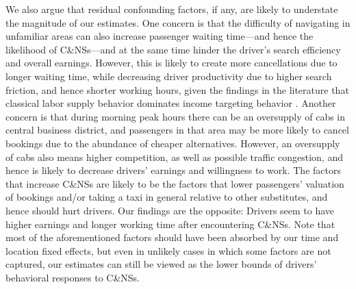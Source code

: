 \documentclass[reviewmode]{AEA}
\begin{document}
We also argue that residual confounding factors, if any, are likely to understate the magnitude of our estimates. One concern is that the difficulty of navigating in unfamiliar areas can also increase passenger waiting time---and hence the likelihood of C\&NSs---and at the same time hinder the driver's search efficiency and overall earnings. However, this is likely to create more cancellations due to longer waiting time, while decreasing driver productivity due to higher search friction, and hence shorter working hours, given the findings in the literature that classical labor supply behavior dominates income targeting behavior \citep{farber2015you}. Another concern is that during morning peak hours there can be an oversupply of cabs in central business district, and passengers in that area may be more likely to cancel bookings due to the abundance of cheaper alternatives. However, an oversupply of cabs also means higher competition, as well as possible traffic congestion, and hence is likely to decrease drivers' earnings and willingness to work.  The factors that increase C\&NSs are likely to be the factors that lower passengers' valuation of bookings and/or taking a taxi in general relative to other substitutes, and hence should hurt drivers. Our findings are the opposite: Drivers seem to have higher earnings and longer working time after encountering C\&NSs. Note that most of the aforementioned factors should have been absorbed by our time and location fixed effects, but even in unlikely cases in which some factors are not captured, our estimates can still be viewed as the lower bounds of drivers' behavioral responses to C\&NSs.
\end{document}
